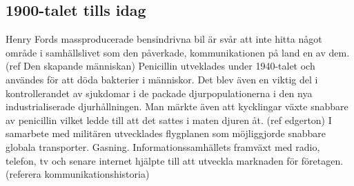 \subsection{1900-talet tills idag}
Henry Fords massproducerade bensindrivna bil är svår att inte hitta något område i samhällslivet som den påverkade, kommunikationen på land en av dem. (ref Den skapande människan) 
\newline
\newline
Penicillin utveklades under 1940-talet och användes för att döda bakterier i människor. Det blev även en viktig del i kontrollerandet av sjukdomar i de packade djurpopulationerna i den nya industrialiserade djurhållningen. Man märkte även att kycklingar växte snabbare av penicillin vilket ledde till att det sattes i maten djuren åt. (ref edgerton) 
\newline
\newline
I samarbete med militären utvecklades flygplanen som möjliggjorde snabbare globala transporter.
\newline
\newline
Gasning. 
\newline
\newline
Informationssamhällets framväxt med radio, telefon, tv och senare internet hjälpte till att utveckla marknaden för företagen. (referera kommunikationshistoria)